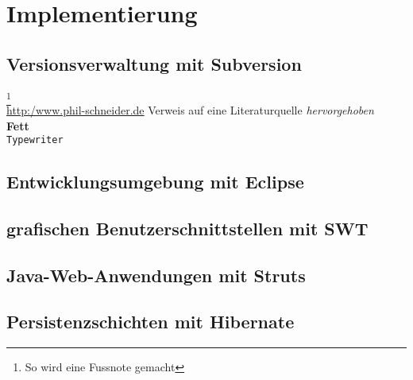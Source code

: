 \chapter{Implementierung} \label{sec:Implementierung}

\section{Versionsverwaltung mit Subversion}
\footnote{So wird eine Fussnote gemacht}\\
\url{http:/www.phil-schneider.de}
\citep{Frotscher2004b} Verweis auf eine Literaturquelle
\emph{hervorgehoben}\\
\textbf{Fett}\\
\texttt{Typewriter}\\

		
\section{Entwicklungsumgebung mit Eclipse}

\section{grafischen Benutzerschnittstellen mit SWT}
		
\section{Java-Web-Anwendungen mit Struts}


\section{Persistenzschichten mit Hibernate}